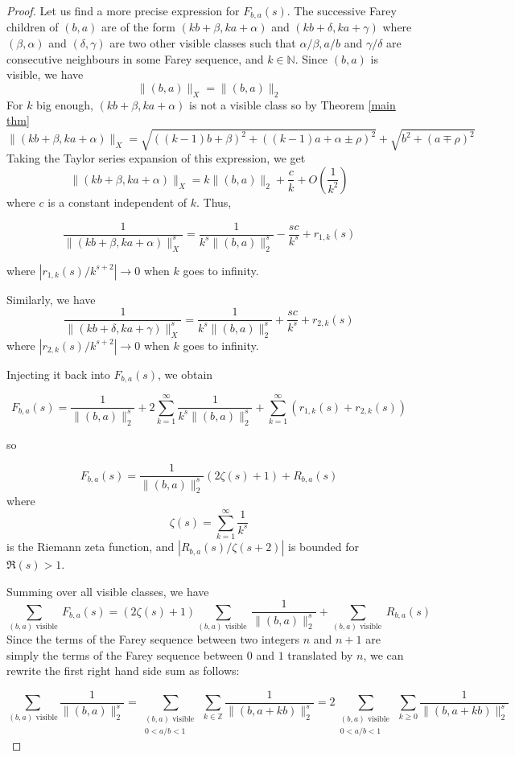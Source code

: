 \documentclass{article}
\newcommand{\NN}{\mathbb{N}}
\newcommand{\ZZ}{\mathbb{Z}}
\newcommand{\St}[1]{\|#1\|_X}
\theoremstyle{definition}
\begin{document}
\begin{proof}
Let us find a more precise expression for $F_{b,a}(s)$. The successive Farey children of $(b,a)$ are of the form $(kb+\beta, ka+\alpha)$ and $(kb+\delta, ka+\gamma)$ where $(\beta,\alpha)$ and $(\delta,\gamma)$ are two other visible classes such that $\alpha /\beta , a/b$ and $\gamma/\delta$ are consecutive neighbours in some Farey sequence, and $k\in\NN$. 
Since $(b,a)$ is visible, we have
$$\St{(b,a)} = \|(b,a)\|_2$$
For $k$ big enough, $(kb+\beta, ka+\alpha)$ is not a visible class so by Theorem \ref{main thm}
$$\St{(kb+\beta, ka+\alpha)} = \sqrt{((k-1)b + \beta)^2 + ((k-1)a+\alpha \pm \rho)^2} + \sqrt{b^2+(a\mp \rho)^2}$$
Taking the Taylor series expansion of this expression, we get
$$\St{(kb+\beta, ka+\alpha)} = k \| (b,a)  \|_2 + \frac{c}{k} + O\left (\frac{1}{k^2}\right )$$
where $c$ is a constant independent of $k$. Thus,

$$\frac{1}{\St{(kb+\beta, ka+\alpha)}^s} = \frac{1}{k^s \|(b,a)\|_2^s} - \frac{sc}{k^s} + r_{1,k}(s)$$

where $|r_{1,k}(s) / k^{s+2}|\longrightarrow 0$ when $k$ goes to infinity.

Similarly, we have
$$\frac{1}{\St{(kb+\delta, ka+\gamma)}^s} = \frac{1}{k^s \|(b,a)\|_2^s} + \frac{sc}{k^s} + r_{2,k}(s)$$
where $|r_{2,k}(s) / k^{s+2}|\longrightarrow 0$ when $k$ goes to infinity.

Injecting it back into $F_{b,a}(s)$, we obtain

$$F_{b,a}(s) = \frac{1}{\|{(b,a)}\|_2^s} + 2\sum_{k=1}^\infty \frac{1}{k^s \| (b,a) \|_2 ^s} + \sum_{k=1}^\infty (r_{1,k}(s) + r_{2,k}(s))$$

so

$$ F_{b,a}(s) = \frac{1}{\|(b,a)\|_2^s } \left( 2\zeta(s) +1\right )  + R_{b,a}(s)$$
where $$\zeta(s) = \sum_{k=1}^\infty \frac{1}{k^s}$$ is the Riemann zeta function, and $|R_{b,a}(s)/\zeta(s+2)|$ is bounded for $\Re(s)>1$. \newline \newline

Summing over all visible classes, we have
$$\sum_{(b,a) \text{ visible }} F_{b,a}(s) =  \left( 2\zeta(s) +1\right ) \sum_{(b,a) \text{ visible }}  \frac{1}{\|(b,a)\|_2^s }  +   \sum_{(b,a) \text{ visible }} R_{b,a}(s)$$
Since the terms of the Farey sequence between two integers $n$ and $n+1$ are simply the terms of the Farey sequence between $0$ and $1$ translated by $n$, we can rewrite the first right hand side sum as follows:

$$ \sum_{(b,a) \text{ visible}}  \frac{1}{\|(b,a)\|_2^s } = \sum_{\substack{(b,a) \text{ visible } \\ 0<a/b<1}} \sum_{k\in \ZZ}  \frac{1}{\|(b,a+kb)\|_2^s } = 2 \sum_{\substack{(b,a) \text{ visible } \\ 0<a/b<1}} \sum_{k\ge 0}  \frac{1}{\|(b,a+kb)\|_2^s }$$


\end{proof}
\end{document}
